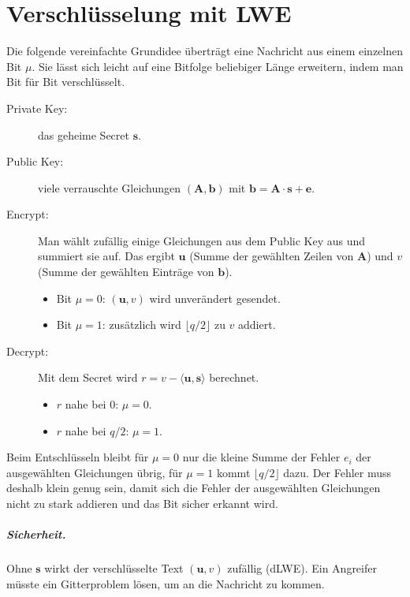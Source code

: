 \chapter{Verschlüsselung mit LWE}\label{ch:encryption}

Die folgende vereinfachte Grundidee überträgt eine Nachricht aus einem einzelnen Bit $\mu$. Sie lässt sich leicht auf eine Bitfolge beliebiger Länge erweitern, indem man Bit für Bit verschlüsselt.

\begin{description}
    \item[Private Key:] das geheime Secret $\mathbf{s}$.
    \item[Public Key:] viele verrauschte Gleichungen $(\mathbf{A}, \mathbf{b})$ mit $\mathbf{b} = \mathbf{A} \cdot \mathbf{s} + \mathbf{e}$.
    \item[Encrypt:] Man wählt zufällig einige Gleichungen aus dem Public Key aus und summiert sie auf. Das ergibt $\mathbf{u}$ (Summe der gewählten Zeilen von $\mathbf{A}$) und $v$ (Summe der gewählten Einträge von $\mathbf{b}$).
    \begin{itemize}
        \item Bit $\mu = 0$: $(\mathbf{u}, v)$ wird unverändert gesendet.
        \item Bit $\mu = 1$: zusätzlich wird $\lfloor q/2 \rfloor$ zu $v$ addiert.
    \end{itemize}
    \item[Decrypt:] Mit dem Secret wird $r = v - \langle \mathbf{u}, \mathbf{s} \rangle$ berechnet.
    \begin{itemize}
        \item $r$ nahe bei $0$: $\mu = 0$.
        \item $r$ nahe bei $q/2$: $\mu = 1$.
    \end{itemize}
\end{description}

Beim Entschlüsseln bleibt für $\mu = 0$ nur die kleine Summe der Fehler $e_i$ der ausgewählten Gleichungen übrig, für $\mu = 1$ kommt $\lfloor q/2 \rfloor$ dazu. Der Fehler muss deshalb klein genug sein, damit sich die Fehler der ausgewählten Gleichungen nicht zu stark addieren und das Bit sicher erkannt wird.

\paragraph{Sicherheit.} Ohne $\mathbf{s}$ wirkt der verschlüsselte Text $(\mathbf{u}, v)$ zufällig (dLWE). Ein Angreifer müsste ein Gitterproblem lösen, um an die Nachricht zu kommen.

